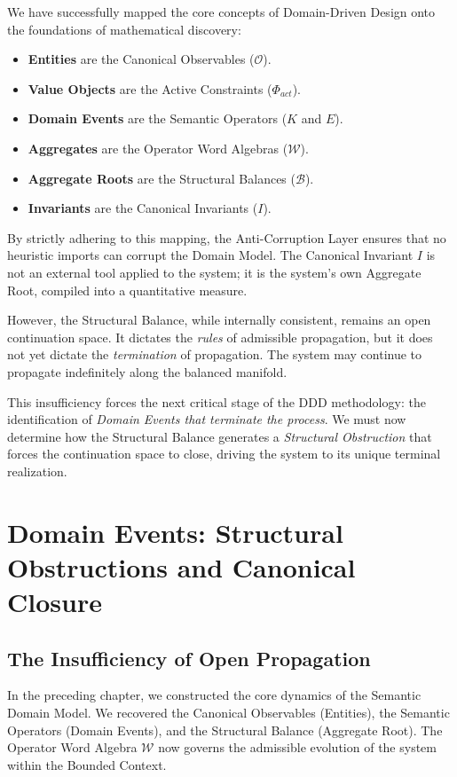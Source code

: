 \documentclass[12pt,openany]{extbook}
\theoremstyle{plain}
\theoremstyle{definition}
\begin{document}
We have successfully mapped the core concepts of Domain-Driven Design onto the foundations of mathematical discovery:
\begin{itemize}
    \item \textbf{Entities} are the Canonical Observables ($\mathcal{O}$).
    \item \textbf{Value Objects} are the Active Constraints ($\Phi_{act}$).
    \item \textbf{Domain Events} are the Semantic Operators ($K$ and $E$).
    \item \textbf{Aggregates} are the Operator Word Algebras ($\mathcal{W}$).
    \item \textbf{Aggregate Roots} are the Structural Balances ($\mathcal{B}$).
    \item \textbf{Invariants} are the Canonical Invariants ($I$).
\end{itemize}

By strictly adhering to this mapping, the Anti-Corruption Layer ensures that no heuristic imports can corrupt the Domain Model. The Canonical Invariant $I$ is not an external tool applied to the system; it is the system's own Aggregate Root, compiled into a quantitative measure.

However, the Structural Balance, while internally consistent, remains an open continuation space. It dictates the \emph{rules} of admissible propagation, but it does not yet dictate the \emph{termination} of propagation. The system may continue to propagate indefinitely along the balanced manifold. 

This insufficiency forces the next critical stage of the DDD methodology: the identification of \emph{Domain Events that terminate the process}. We must now determine how the Structural Balance generates a \emph{Structural Obstruction} that forces the continuation space to close, driving the system to its unique terminal realization.

\chapter{Domain Events: Structural Obstructions and Canonical Closure}

\section{The Insufficiency of Open Propagation}

In the preceding chapter, we constructed the core dynamics of the Semantic Domain Model. We recovered the Canonical Observables (Entities), the Semantic Operators (Domain Events), and the Structural Balance (Aggregate Root). The Operator Word Algebra $\mathcal{W}$ now governs the admissible evolution of the system within the Bounded Context.
\end{document}
